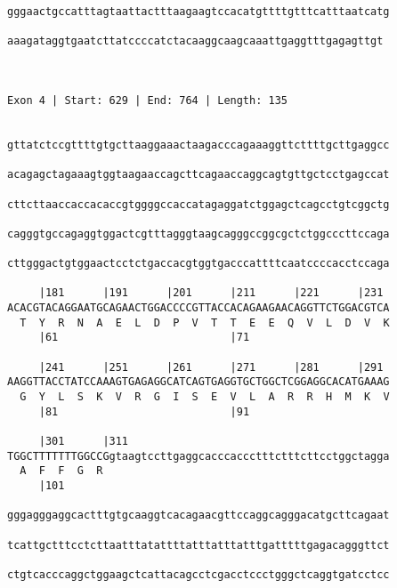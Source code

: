 \documentclass{article}
\begin{document}
\begin{Verbatim}
gggaactgccatttagtaattactttaagaagtccacatgttttgtttcatttaatcatg
                                                            
aaagataggtgaatcttatccccatctacaaggcaagcaaattgaggtttgagagttgt
                                                           
                                                           
 
Exon 4 | Start: 629 | End: 764 | Length: 135


gttatctccgttttgtgcttaaggaaactaagacccagaaaggttcttttgcttgaggcc
                                                            
acagagctagaaagtggtaagaaccagcttcagaaccaggcagtgttgctcctgagccat
                                                            
cttcttaaccaccacaccgtggggccaccatagaggatctggagctcagcctgtcggctg
                                                            
cagggtgccagaggtggactcgtttagggtaagcagggccggcgctctggcccttccaga
                                                            
cttgggactgtggaactcctctgaccacgtggtgacccattttcaatccccacctccaga
                                                            
     |181      |191      |201      |211      |221      |231 
ACACGTACAGGAATGCAGAACTGGACCCCGTTACCACAGAAGAACAGGTTCTGGACGTCA
  T  Y  R  N  A  E  L  D  P  V  T  T  E  E  Q  V  L  D  V  K
     |61                           |71                      
  
     |241      |251      |261      |271      |281      |291 
AAGGTTACCTATCCAAAGTGAGAGGCATCAGTGAGGTGCTGGCTCGGAGGCACATGAAAG
  G  Y  L  S  K  V  R  G  I  S  E  V  L  A  R  R  H  M  K  V
     |81                           |91                      
  
     |301      |311                                         
TGGCTTTTTTTGGCCGgtaagtccttgaggcacccaccctttctttcttcctggctagga
  A  F  F  G  R                                             
     |101                                                   
  
gggagggaggcactttgtgcaaggtcacagaacgttccaggcagggacatgcttcagaat
                                                            
tcattgctttcctcttaatttatattttatttatttatttgatttttgagacagggttct
                                                            
ctgtcacccaggctggaagctcattacagcctcgacctccctgggctcaggtgatcctcc
                                                            

\end{Verbatim}
\end{document}
